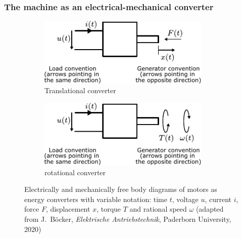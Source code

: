 \begin{frame}
	\frametitle{The machine as an electrical-mechanical converter}
	\begin{figure}
		\centering
		\begin{subfigure}[b]{0.49\textwidth}
			\centering
			\includegraphics[width=0.9\textwidth]{fig/lec01/Block_diagram_translational_converter.pdf}
			\caption{Translational converter}
		\end{subfigure}
		\hfill
		\begin{subfigure}[b]{0.49\textwidth}
			\centering
			\includegraphics[width=0.9\textwidth]{fig/lec01/Block_diagram_rotational_converter.pdf}
			\caption{rotational converter}
		\end{subfigure}
		\caption{Electrically and mechanically free body diagrams of motors as energy converters  with variable notation: time $t$, voltage $u$, current $i$, force $F$, displacement $x$, torque $T$ and rational speed $\omega$ (adapted from J.~B\"ocker, \textit{Elektrische Antriebstechnik}, Paderborn University, 2020)} 
        \label{fig:free_body_diagrams_motor}
	\end{figure}
\end{frame}

